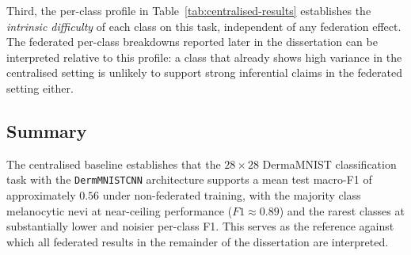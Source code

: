 Third, the per-class profile in
Table~\ref{tab:centralised-results} establishes the
\emph{intrinsic difficulty} of each class on this task,
independent of any federation effect. The federated per-class
breakdowns reported later in the dissertation can be interpreted
relative to this profile: a class that already shows high
variance in the centralised setting is unlikely to support strong
inferential claims in the federated setting either.

\subsection{Summary}
\label{sec:centralised-summary}

The centralised baseline establishes that the $28\times28$
DermaMNIST classification task with the \texttt{DermMNISTCNN}
architecture supports a mean test macro-F1 of approximately $0.56$
under non-federated training, with the majority class melanocytic
nevi at near-ceiling performance ($F1 \approx 0.89$) and the
rarest classes at substantially lower and noisier per-class F1.
This serves as the reference against which all federated results
in the remainder of the dissertation are interpreted.
